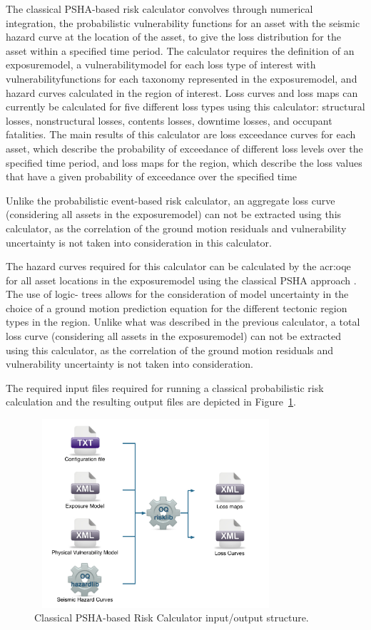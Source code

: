 The classical PSHA-based risk calculator convolves through numerical
integration, the probabilistic vulnerability functions for an \gls{asset} with
the seismic hazard curve at the location of the asset, to give the loss
distribution for the asset within a specified time period. The calculator
requires the definition of an \gls{exposuremodel}, a \gls{vulnerabilitymodel} for
each loss type of interest with \glspl{vulnerabilityfunction} for each taxonomy
represented in the \gls{exposuremodel}, and hazard curves calculated in the
region of interest. Loss curves and loss maps can currently be calculated for
five different loss types using this calculator: structural losses,
nonstructural losses, contents losses, downtime losses, and occupant
fatalities. The main results of this calculator are loss exceedance curves for
each asset, which describe the probability of exceedance of different loss
levels over the specified time period, and loss maps for the region, which
describe the loss values that have a given probability of exceedance over the
specified time

Unlike the probabilistic event-based risk calculator, an aggregate loss curve
(considering all assets in the \gls{exposuremodel}) can not be extracted using
this calculator, as the correlation of the ground motion residuals and
vulnerability uncertainty is not taken into consideration in this calculator.

The hazard curves required for this calculator can be calculated by the
\glsdesc{acr:oqe} for all asset locations in the \gls{exposuremodel} using the
classical PSHA approach \citep{cornell1968, mcguire1976}. The use of logic-
trees allows for the consideration of model uncertainty in the choice of a
ground motion prediction equation for the different tectonic region types in
the region. Unlike what was described in the previous calculator, a total loss
curve (considering all assets in the \gls{exposuremodel}) can not be extracted
using this calculator, as the correlation of the ground motion residuals and
vulnerability uncertainty is not taken into consideration.

The required input files required for running a classical probabilistic risk
calculation and the resulting output files are depicted in
Figure~\ref{fig:io-structure-classical-risk}.

\begin{figure}[ht]
\centering
\includegraphics[width=9cm,height=7cm]{figures/risk/io-structure-classical-risk.pdf}
\caption{Classical PSHA-based Risk Calculator input/output structure.}
\label{fig:io-structure-classical-risk}
\end{figure}